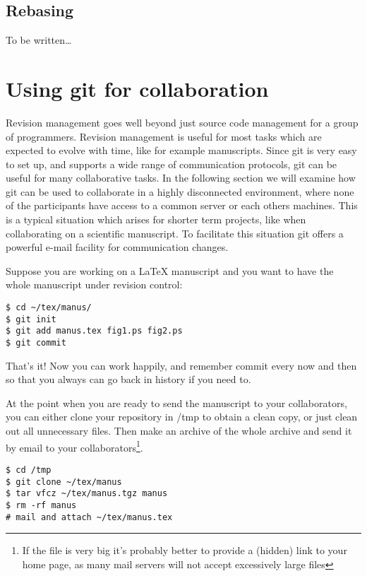 \documentclass[a4paper,10pt]{article}
\begin{document}
\subsection{Rebasing}
To be written\ldots

\section{Using git for collaboration}
Revision management goes well beyond just source code management for a group
of programmers. Revision management is useful for most tasks which are
expected to evolve with time, like for example manuscripts.
Since git is very easy to set up, and supports a wide range of communication
protocols, git can be useful for many collaborative tasks. In the following
section we will examine how git can be used to collaborate in a highly
disconnected environment, where none of the participants have access to a
common server or each others machines. This is a typical situation which
arises for shorter term projects, like when collaborating on a scientific
manuscript. To facilitate this situation git offers a powerful e-mail facility
for communication changes.

Suppose you are working on a LaTeX manuscript and you want to have the whole
manuscript under revision control:
\begin{verbatim}
$ cd ~/tex/manus/
$ git init
$ git add manus.tex fig1.ps fig2.ps
$ git commit
\end{verbatim}
That's it! Now you can work happily, and remember commit every now and then so
that you always can go back in history if you need to. 

At the point when you are ready to send the manuscript to your collaborators,
you can either clone your repository in /tmp to obtain a clean copy, or just
clean out all unnecessary files. Then make an archive of the whole archive and
send it by email to your collaborators\footnote{If the file is very big it's
probably better to provide a (hidden) link to your home page, as many mail
servers will not accept excessively large files}. 
\begin{verbatim}
$ cd /tmp
$ git clone ~/tex/manus
$ tar vfcz ~/tex/manus.tgz manus
$ rm -rf manus
# mail and attach ~/tex/manus.tex
\end{verbatim}
\end{document}
